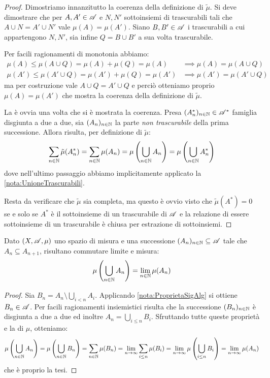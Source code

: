 \begin{proof}
	Dimostriamo innanzitutto la coerenza della definizione di $\tilde\mu$. Si deve dimostrare che per $A,A'\in\mathscr A$ e $N,N'$ sottoinsiemi di trascurabili tali che $A\cup N=A'\cup N'$ vale $\mu(A)=\mu(A')$. Siano $B,B'\in\mathscr A$ i trascurabili a cui appartengono $N,N'$, sia infine $Q=B\cup B'$ a sua volta trascurabile.
	
	Per facili ragionamenti di monotonia abbiamo:
	\begin{align*}
		\mu(A)\le \mu(A\cup Q) =\mu(A)+\mu(Q)=\mu(A) &\implies \mu(A)=\mu(A\cup Q)\\
		\mu(A')\le \mu(A'\cup Q) =\mu(A')+\mu(Q)=\mu(A') &\implies \mu(A')=\mu(A'\cup Q)
	\end{align*}
	ma per costruzione vale $A\cup Q=A'\cup Q$ e perciò otteniamo proprio $\mu(A)=\mu(A')$ che mostra la coerenza della definizione di $\tilde\mu$.
	
	La \sigadd[ità] è ovvia una volta che si è mostrata la coerenza. Presa $(A^*_n)_{n\in\mathbb N}\in\mathscr A^*$ famiglia disgiunta a due a due, sia $(A_n)_{n\in\mathbb N}$ la parte \emph{non trascurabile} della prima successione. Allora risulta, per definizione di $\tilde\mu$:
	\begin{equation*}
		\sum_{n\in\mathbb N} \tilde\mu(A^*_n)=\sum_{n\in\mathbb N} \mu(A_n)=\mu\left(\bigcup_{n\in\mathbb N} A_n\right)=\mu\left(\bigcup_{n\in\mathbb N} A^*_n\right)
	\end{equation*}
	dove nell'ultimo passaggio abbiamo implicitamente applicato la \cref{nota:UnioneTrascurabili}.
	
	Resta da verificare che $\tilde\mu$ sia completa, ma questo è ovvio visto che  $\tilde\mu(A^*)=0$ se e solo se $A^*$ è il sottoinsieme di un trascurabile di $\mathscr A$ e la relazione di essere sottoinsieme di un trascurabile è chiusa per estrazione di sottoinsiemi. 

\end{proof}



\begin{proposition}\label{prop:LimiteMonotonoCrescenteMisura}
	Dato $(X,\mathscr A,\mu)$ uno spazio di misura e una successione $(A_n)_{n\in\mathbb N}\subseteq \mathscr A$ tale che $A_n\subseteq A_{n+1}$, risultano commutare limite e misura:
	\begin{equation*}
		\mu\left(\bigcup_{n\in\mathbb N} A_n\right)=\lim_{n\in\mathbb N} \mu(A_n)
	\end{equation*}
\end{proposition}
\begin{proof}
	Sia $B_n=A_n\setminus\bigcup_{i<n}A_i$. Applicando \cref{nota:ProprietaSigAlg} si ottiene $B_n\in\mathscr A$.
	Per facili ragionamenti insiemistici risulta che la successione $(B_n)_{n\in\mathbb N}$ è disgiunta a due a due ed inoltre $A_n=\bigcup_{i\le n}B_i$.
	Sfruttando tutte queste proprietà e la \sigadd[ità] di $\mu$, otteniamo:
	\begin{equation*}
		\mu\left(\bigcup_{n\in\mathbb N} A_n\right)=\mu\left(\bigcup_{n\in\mathbb N} B_n\right)=
		\sum_{n\in\mathbb N} \mu(B_n)=\lim_{n\to\infty} \sum_{i\le n} \mu(B_i)=
		\lim_{n\to\infty} \mu\left(\bigcup_{i\le n} B_i\right)=\lim_{n\to\infty} \mu(A_n)
	\end{equation*}
	che è proprio la tesi.
\end{proof}

